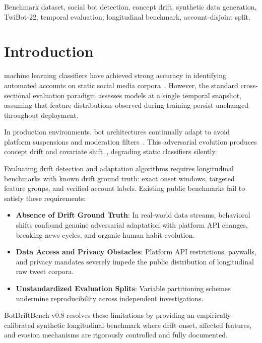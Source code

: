 \documentclass[journal]{IEEEtran}
\begin{document}
\begin{IEEEkeywords}
Benchmark dataset, social bot detection, concept drift, synthetic data generation, TwiBot-22, temporal evaluation, longitudinal benchmark, account-disjoint split.
\end{IEEEkeywords}

\section{Introduction}
 machine learning classifiers have achieved strong accuracy in identifying automated accounts on static social media corpora~\cite{cresci2017paradigm,feng2022twibot}. However, the standard cross-sectional evaluation paradigm assesses models at a single temporal snapshot, assuming that feature distributions observed during training persist unchanged throughout deployment. 

In production environments, bot architectures continually adapt to avoid platform suspensions and moderation filters~\cite{ferrara2016rise,hays2025bots}. This adversarial evolution produces concept drift and covariate shift~\cite{gama2014survey}, degrading static classifiers silently. 

Evaluating drift detection and adaptation algorithms requires longitudinal benchmarks with known drift ground truth: exact onset windows, targeted feature groups, and verified account labels. Existing public benchmarks fail to satisfy these requirements:
\begin{itemize}
    \item \textbf{Absence of Drift Ground Truth}: In real-world data streams, behavioral shifts confound genuine adversarial adaptation with platform API changes, breaking news cycles, and organic human habit evolution.
    \item \textbf{Data Access and Privacy Obstacles}: Platform API restrictions, paywalls, and privacy mandates severely impede the public distribution of longitudinal raw tweet corpora.
    \item \textbf{Unstandardized Evaluation Splits}: Variable partitioning schemes undermine reproducibility across independent investigations.
\end{itemize}

BotDriftBench v0.8 resolves these limitations by providing an empirically calibrated synthetic longitudinal benchmark where drift onset, affected features, and evasion mechanisms are rigorously controlled and fully documented.
\end{document}
